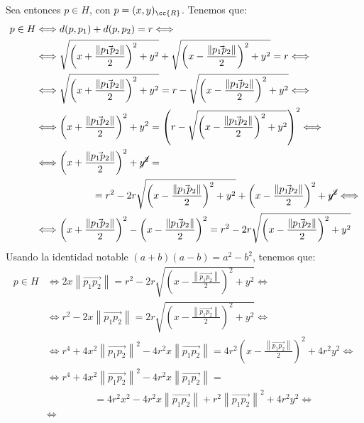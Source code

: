 \begin{ejercicio}
\begin{enumerate}
    Sea entonces $p\in H$, con $p=(x,y)_{\cc{R}}$. Tenemos que:
    \begin{align*}
        p\in H &\Longleftrightarrow
        d(p,p_1) + d(p,p_2) = r \Longleftrightarrow \\ & \Longleftrightarrow
        \sqrt{\left(x+\frac{\left\|\vec{p_1p_2}\right\|}{2}\right)^2 + y^2} + \sqrt{\left(x-\frac{\left\|\vec{p_1p_2}\right\|}{2}\right)^2 + y^2} = r \Longleftrightarrow \\ & \Longleftrightarrow
        \sqrt{\left(x+\frac{\left\|\vec{p_1p_2}\right\|}{2}\right)^2 + y^2} = r - \sqrt{\left(x-\frac{\left\|\vec{p_1p_2}\right\|}{2}\right)^2 + y^2} \Longleftrightarrow \\ & \Longleftrightarrow
        \left(x+\frac{\left\|\vec{p_1p_2}\right\|}{2}\right)^2 + y^2 = \left(r - \sqrt{\left(x-\frac{\left\|\vec{p_1p_2}\right\|}{2}\right)^2 + y^2}\right)^2 \Longleftrightarrow \\ & \Longleftrightarrow
        \left(x+\frac{\left\|\vec{p_1p_2}\right\|}{2}\right)^2 + \cancel{y^2} =\\&\hspace{2cm}=r^2 - 2r\sqrt{\left(x-\frac{\left\|\vec{p_1p_2}\right\|}{2}\right)^2 + y^2} + \left(x-\frac{\left\|\vec{p_1p_2}\right\|}{2}\right)^2 + \cancel{y^2} \Longleftrightarrow \\ & \Longleftrightarrow
        \left(x+\frac{\left\|\vec{p_1p_2}\right\|}{2}\right)^2 - \left(x-\frac{\left\|\vec{p_1p_2}\right\|}{2}\right)^2 =r^2 - 2r\sqrt{\left(x-\frac{\left\|\vec{p_1p_2}\right\|}{2}\right)^2 + y^2}
    \end{align*}
    Usando la identidad notable $(a+b)(a-b)=a^2-b^2$, tenemos que:
    \begin{align*}
        p\in H &\Longleftrightarrow
        2x\left\|\vec{p_1p_2}\right\| = r^2 - 2r\sqrt{\left(x-\frac{\left\|\vec{p_1p_2}\right\|}{2}\right)^2 + y^2} \Longleftrightarrow \\ & \Longleftrightarrow
        r^2 - 2x\left\|\vec{p_1p_2}\right\| = 2r\sqrt{\left(x-\frac{\left\|\vec{p_1p_2}\right\|}{2}\right)^2 + y^2} \Longleftrightarrow \\ & \Longleftrightarrow
        r^4 + 4x^2\left\|\vec{p_1p_2}\right\|^2 - 4r^2x\left\|\vec{p_1p_2}\right\| = 4r^2\left(x-\frac{\left\|\vec{p_1p_2}\right\|}{2}\right)^2 + 4r^2y^2 \Longleftrightarrow \\ & \Longleftrightarrow
        r^4 + 4x^2\left\|\vec{p_1p_2}\right\|^2 - 4r^2x\left\|\vec{p_1p_2}\right\| =\\&\hspace{2cm}=4r^2x^2 - 4r^2x\left\|\vec{p_1p_2}\right\| +r^2\left\|\vec{p_1p_2}\right\|^2 + 4r^2y^2 \Longleftrightarrow \\ & \Longleftrightarrow

\end{align*}
\end{enumerate}
\end{ejercicio}
